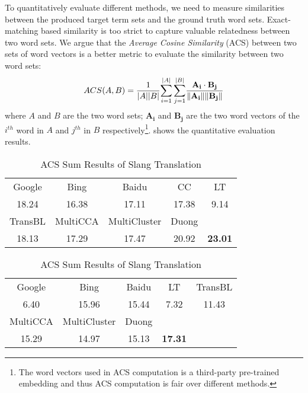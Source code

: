 To quantitatively evaluate different methods, we need to measure similarities between the produced target term sets and the ground truth word sets.
Exact-matching based similarity is too strict to capture valuable relatedness between two word sets.  
We argue that the\textit{ Average Cosine Similarity} (ACS) between two sets of word vectors is a better metric to evaluate the similarity between two word sets:
\begin{align*}
\vspace{-3pt}
ACS (A,B)=
{\frac{1}{|A||B|}}{\sum_{i=1}^{|A|}{\sum_{j=1}^{|B|}} \frac{\mathbf{A_i }\cdot \mathbf{B_j}}{\|\mathbf{A_i }\|\|\mathbf{B_j }\|}}
\vspace{-2pt}
\end{align*} 
where $A$ and $B$ are the two word sets; $\mathbf{A_i}$ and $\mathbf{B_j}$ are the two word vectors of the $i^{th}$ word in $A$ and $j^{th}$ in $B$ respectively\footnote{{\scriptsize The word vectors used in ACS computation is a third-party pre-trained 
		embedding and thus ACS computation is fair over different methods.}}. 
 shows the quantitative evaluation results. 
\begin{table}[] 
	\caption{ACS Sum Results of Slang Translation 	\vspace{-10pt}}
	\small
	\centering
	\begin{subtable}[h]{0.9\columnwidth}
		\centering
		\begin{tabular}{|ccccc|}
			\hline
			Google&  Bing& Baidu & CC & LT   \\ 
			18.24 &  16.38&  17.11 & 17.38 & 9.14 \\ \hline
			TransBL& MultiCCA & MultiCluster & Duong   & \textbf{\socvec} \\ 
			18.13 &  17.29 & 17.47&  20.92& \textbf{23.01}\\ \hline  
		\end{tabular}
	\end{subtable}
	\begin{subtable}[h]{0.9\columnwidth}
		\centering
		\begin{tabular}{|ccccc|}
			\hline
			Google&  Bing& Baidu &  LT   & TransBL\\ 
			6.40  &   15.96 &  15.44  & 7.32 & 11.43\\    \hline
			MultiCCA & MultiCluster & Duong   & \textbf{\socvec} & \\ 
			15.29 & 14.97&  15.13& \textbf{17.31} & \\ \hline  
		\end{tabular}
	\end{subtable}
	
	\label{tab:bleis_acs}
\end{table}

